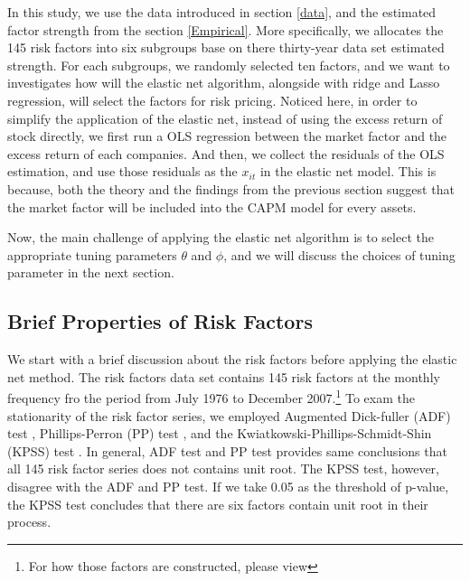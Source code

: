 In this study, we use the data introduced in section \ref{data}, and the estimated factor strength from the section \ref{Empirical}.
More specifically, we allocates the 145 risk factors into six subgroups base on there thirty-year data set estimated strength.
For each subgroups, we randomly selected ten factors, and we want to investigates how will the elastic net algorithm, alongside with ridge and Lasso regression, will select the factors for risk pricing.
Noticed here, in order to simplify the application of the elastic net, instead of using the excess return of stock directly, we first run a OLS regression between the market factor and the excess return of each companies.
And then, we collect the residuals of the OLS estimation, and use those residuals as the $x_{it}$ in the elastic net model.
This is because, both the theory and the findings from the previous section suggest that the market factor will be included into the CAPM model for every assets.

Now, the main challenge of applying the elastic net algorithm is to select the appropriate tuning parameters $\theta$ and $\phi$, and we will discuss the choices of tuning parameter in the next section.

	\subsection{Brief Properties of Risk Factors}
We start with a brief discussion about the risk factors before applying the elastic net method.
The risk factors data set contains 145 risk factors at the monthly frequency fro the period from July 1976 to December 2007.\footnote{For how those factors are constructed, please view }
To exam the stationarity of the risk factor series, we employed Augmented Dick-fuller (ADF) test \cite{Dickey1979},  Phillips-Perron (PP) test \cite{Phillips1988}, and the Kwiatkowski-Phillips-Schmidt-Shin (KPSS) test \cite{Kwiatkowski1992}.
In general, ADF test and PP test provides same conclusions that all 145 risk factor series does not contains unit root.
The KPSS test, however, disagree with the ADF and PP test.
If we take 0.05 as the threshold of p-value, the KPSS test concludes that there are six factors contain unit root in their process.


